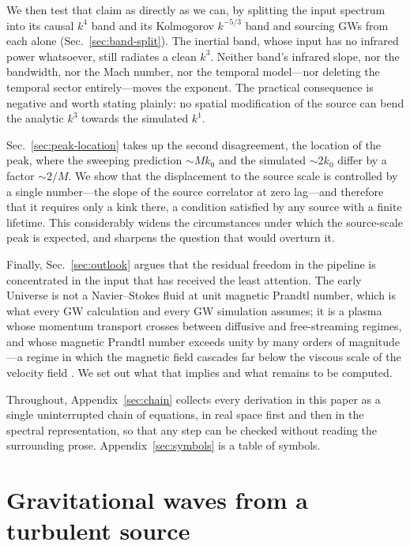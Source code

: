 \documentclass[10pt,prd,aps,nobibnotes,superscriptaddress,preprintnumbers,notitlepage]{revtex4-1}
\begin{document}
We then test that claim as directly as we can, by splitting the input spectrum
into its causal $k^{4}$ band and its Kolmogorov $k^{-5/3}$ band and sourcing GWs
from each alone (Sec.~\ref{sec:band-split}). The inertial band, whose input has no
infrared power whatsoever, still radiates a clean $k^{3}$. Neither band's infrared
slope, nor the bandwidth, nor the Mach number, nor the temporal model---nor
deleting the temporal sector entirely---moves the exponent. The practical
consequence is negative and worth stating plainly: no spatial modification of the
source can bend the analytic $k^{3}$ towards the simulated $k^{1}$.

Sec.~\ref{sec:peak-location} takes up the second disagreement, the location of the
peak, where the sweeping prediction $\sim Mk_0$ and the simulated $\sim2k_0$ differ
by a factor $\sim2/M$. We show that the displacement to the source scale is
controlled by a single number---the slope of the source correlator at zero
lag---and therefore that it requires only a kink there, a condition satisfied by
any source with a finite lifetime. This considerably widens the circumstances under
which the source-scale peak is expected, and sharpens the question that would
overturn it.

Finally, Sec.~\ref{sec:outlook} argues that the residual freedom in the pipeline is
concentrated in the input that has received the least attention. The early Universe
is not a Navier--Stokes fluid at unit magnetic Prandtl number, which is what every
GW calculation and every GW simulation assumes; it is a plasma whose momentum
transport crosses between diffusive and free-streaming regimes, and whose magnetic
Prandtl number exceeds unity by many orders of magnitude
\cite{Jedamzik:1996wp,Banerjee:2004df}---a regime in which the magnetic field
cascades far below the viscous scale of the velocity field
\cite{Schekochihin:2020aqu}. We set out what that implies and what remains to be
computed.

Throughout, Appendix~\ref{sec:chain} collects every derivation in this paper as a
single uninterrupted chain of equations, in real space first and then in the
spectral representation, so that any step can be checked without reading the
surrounding prose. Appendix~\ref{sec:symbols} is a table of symbols.
\section{Gravitational waves from a turbulent source}
\label{sec:framework}
\end{document}
